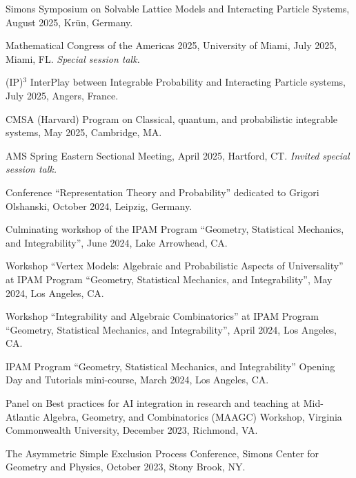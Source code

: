 \documentclass[letterpaper,11pt]{article}
\begin{document}
\begin{etaremune}

\item Simons Symposium on Solvable Lattice Models and Interacting Particle Systems, August 2025, Kr\"un, Germany.

\item Mathematical Congress of the Americas 2025,
	University of Miami,
	July 2025, Miami, FL.
	\emph{Special session talk.}

\item (IP)$^3$ InterPlay between Integrable Probability and Interacting Particle systems,
 July 2025, Angers, France.

\item CMSA (Harvard) Program on Classical, quantum, and probabilistic integrable systems, May 2025,
Cambridge, MA.

\item AMS Spring Eastern Sectional Meeting,
	April 2025,
	Hartford, CT.
	\emph{Invited special session talk.}

\item
Conference ``Representation Theory and Probability'' dedicated to Grigori Olshanski,
October 2024, Leipzig, Germany.

	\item
		Culminating workshop of the
		IPAM Program ``Geometry, Statistical Mechanics, and Integrability'',
		June 2024, Lake Arrowhead, CA.
	\item
		Workshop
		``Vertex Models: Algebraic and Probabilistic Aspects of Universality''
		at
		IPAM Program ``Geometry, Statistical Mechanics, and Integrability'',
		May 2024, Los Angeles, CA.
	\item
		Workshop ``Integrability and Algebraic Combinatorics''
		at
		IPAM Program ``Geometry, Statistical Mechanics, and Integrability'',
		April 2024, Los Angeles, CA.
	\item
	IPAM Program ``Geometry, Statistical Mechanics, and Integrability''
	Opening Day and Tutorials mini-course, March 2024, Los Angeles, CA.
	\item
	Panel on Best practices for AI integration in research and teaching
	at
	Mid-Atlantic Algebra, Geometry, and Combinatorics (MAAGC) Workshop,
	Virginia Commonwealth University,
	December 2023,
	Richmond, VA.

	\item
	The Asymmetric Simple Exclusion Process Conference, Simons Center for Geometry and Physics, October 2023, Stony Brook, NY.


\end{etaremune}
\end{document}

